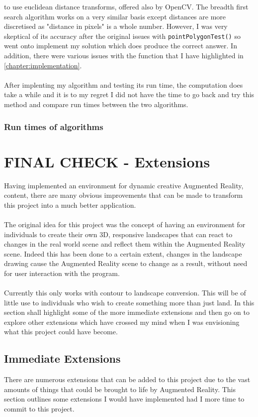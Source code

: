 \documentclass[11pt]{article}
\begin{document}
to use euclidean distance transforms, offered also by OpenCV. The breadth
first search algorithm works on a very similar basis except distances
are more discretised as "distance in pixels" is a whole number. However,
I was very skeptical of its accuracy after the original issues with
\texttt{pointPolygonTest()} so went onto implement my solution which does produce
the correct answer. In addition, there were various issues with the function
that I have highlighted in \ref{chapter:implementation}. \\
\\
After implenting my algorithm and testing its run time,
the computation does take a while and it is
to my regret I did not have the time to go back and try this method and
compare run times between the two algorithms.

\subsubsection{Run times of algorithms}


\section{FINAL CHECK - Extensions}
\label{chapter:extensions}
Having implemented an environment for dynamic creative Augmented Reality,
content, there are many obvious improvements that can be made to transform 
this project into a much better application. \\
\\
The original idea for this project was the concept of having an environment
for individuals to create their own 3D, responsive landscapes that can react
to changes in the real world scene and reflect them within the Augmented Reality scene. Indeed
this has been done to a certain extent, changes in the landscape drawing cause
the Augmented Reality scene to change as a result, without need for user interaction with the
program.\\
\\
Currently this only works with contour to landscape conversion. This
will be of little use to individuals who wish to create something more 
than just land. In this section shall highlight some of the more 
immediate extensions and then go on to explore other extensions 
which have crossed my mind when I was envisioning what 
this project could have become.

\subsection{Immediate Extensions}
There are numerous extensions that can be added to this project due to the 
vast amounts of things that could be brought to life by Augmented Reality.
This section outlines some extensions I would have implemented had I
more time to commit to this project.
\end{document}
